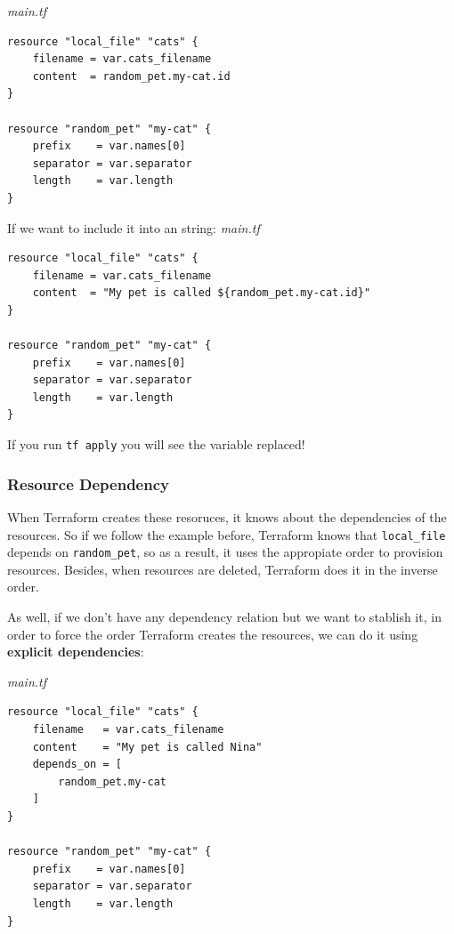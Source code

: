 \documentclass{article}
\newenvironment{codetemplate}[1][]{%
  \mybasecolorbox[#1]
  \itshape
}{%
  \endmybasecolorbox
}
\begin{document}
\begin{codetemplate}{main.tf}
\begin{verbatim}
resource "local_file" "cats" {
    filename = var.cats_filename
    content  = random_pet.my-cat.id
}
    
resource "random_pet" "my-cat" {
    prefix    = var.names[0]
    separator = var.separator
    length    = var.length
}
\end{verbatim}
\end{codetemplate}

If we want to include it into an string:
\begin{codetemplate}{main.tf}
\begin{verbatim}
resource "local_file" "cats" {
    filename = var.cats_filename
    content  = "My pet is called ${random_pet.my-cat.id}"
}
    
resource "random_pet" "my-cat" {
    prefix    = var.names[0]
    separator = var.separator
    length    = var.length
}
\end{verbatim}
\end{codetemplate}

If you run \verb+tf apply+ you will see the variable replaced!

\subsubsection{Resource Dependency}
When Terraform creates these resoruces, it knows about the dependencies of the resources. So if we follow the example before, Terraform knows that \verb+local_file+ depends on \verb+random_pet+, so as a result, it uses the appropiate order to provision resources. Besides, when resources are deleted, Terraform does it in the inverse order.

As well, if we don't have any dependency relation but we want to stablish it, in order to force the order Terraform creates the resources, we can do it using \textbf{explicit dependencies}:

\begin{codetemplate}{main.tf}
\begin{verbatim}
resource "local_file" "cats" {
    filename   = var.cats_filename
    content    = "My pet is called Nina"
    depends_on = [
        random_pet.my-cat
    ]
}
    
resource "random_pet" "my-cat" {
    prefix    = var.names[0]
    separator = var.separator
    length    = var.length
}
\end{verbatim}
\end{codetemplate}
\end{document}

